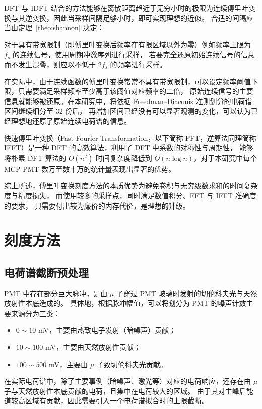 DFT 与 IDFT 结合的方法能够在离散距离趋近于无穷小时的极限为连续傅里叶变换与其逆变换，因此当采样间隔足够小时，即可实现理想的近似。
合适的间隔应当由定理~\ref{theo:shannon} 决定：
\begin{theorem}\label{theo:shannon}
    对于具有带宽限制（即傅里叶变换后频率在有限区域以外为零）例如频率上限为 $f_s$ 的连续信号，使用周期冲激序列进行采样，
    若要完全还原初始连续信号的信息而不发生混叠，则应以不低于 $2f_s$ 的频率进行采样。
\end{theorem}

在实际中，由于连续函数的傅里叶变换常常不具有带宽限制，可以设定频率阈值下限，只需要满足采样频率至少高于该阈值对应频率的二倍，
原始连续信号的主要信息就能够被还原。在本研究中，将依据 Freedman–Diaconis 准则划分的电荷谱区间继续细分至 32 份后，
再增加区间已经没有可以显著观测的变化，可以认为已经理想地还原了原始连续电荷谱的信息。

快速傅里叶变换（Fast Fourier Transformation，以下简称 FFT，逆算法同理简称 IFFT）是一种 DFT 的高效算法，利用了 DFT 中系数的对称性与周期性，
能够将朴素 DFT 算法的 $O(n^2)$ 时间复杂度降低到 $O(n\log{n})$，对于本研究中每个 MCP-PMT 数万至数十万的统计量表现出显著的优势。

综上所述，傅里叶变换刻度方法的本质优势为避免卷积与无穷级数求和的时间复杂度与精度损失，
而使用较多的采样点，同时满足数值积分、FFT 与 IFFT 准确度的要求，
只需要付出较为廉价的内存代价，是理想的升级。

\section{刻度方法}

\subsection{电荷谱截断预处理}\label{sec:cut}
PMT 中存在部分巨大脉冲，是由 $\mu$ 子穿过 PMT 玻璃时发射的切伦科夫光与天然放射性本底造成的\cite{zhangStudy20inchPMTs2022}。
具体地，根据脉冲幅值，可以将划分为 PMT 的噪声计数主要来源分为三类\cite{zhangDarkCount20inch2024}：
\begin{itemize}
    \item $0\sim10$ mV，主要由热致电子发射（暗噪声）贡献；
    \item $10\sim100$ mV，主要由天然放射性贡献；
    \item $100\sim500$ mV，主要由 $\mu$ 子致切伦科夫光贡献。
\end{itemize}

在实际电荷谱中，除了主要事例（暗噪声、激光等）对应的电荷响应，还存在由 $\mu$ 子与天然放射性本底贡献的电荷，且集中在电荷较大的区域。
由于其对主峰后能道较高区域有贡献，因此需要引入一个电荷谱拟合时的上限截断。

